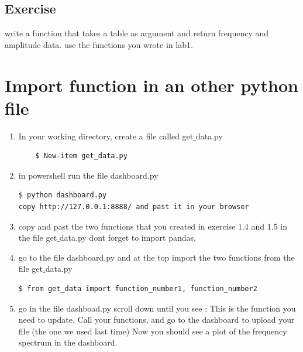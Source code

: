 \documentclass[10pt,a4paper,titlepage]{article}
\begin{document}
\subsection{Exercise}
write a function that takes a table as argument and return frequency and amplitude data.
use the functions you wrote in lab1.

\section{Import function in an other python file}
\begin{enumerate}
	\item In your working directory, create a file called get$\_$data.py
	\begin{lstlisting}
	$ New-item get_data.py
	\end{lstlisting}
	\item in powershell run the file dashboard.py
\begin{lstlisting}
$ python dashboard.py
copy http://127.0.0.1:8888/ and past it in your browser
\end{lstlisting}

\item copy and past the two functions that you created in exercise 1.4 and 1.5 in the file get$\_$data.py
dont forget to import pandas.
\item go to the file dashboard.py and at the top import the two functions from the file get$\_$data.py
\begin{lstlisting}
$ from get_data import function_number1, function_number2
\end{lstlisting}
\item go in the file dashboad.py scroll down until you see : This is the function you need to update.
Call your functions, and go to the dashboard to upload your file (the one we used last time)
Now you should see a plot of the frequency spectrum in the dashboard.
\end{enumerate}
\end{document}
